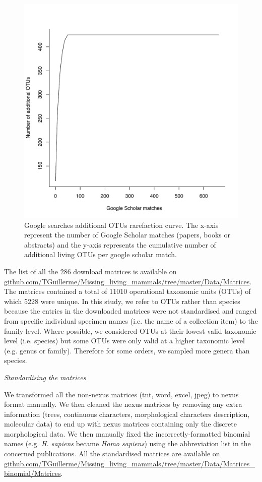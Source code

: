 \documentclass[12pt,letterpaper]{article}
\renewcommand{\subsection}[1]{%
\bigskip
\begin{center}
\begin{large}
\normalfont\itshape #1
\end{large}
\end{center}}
\begin{document}
\begin{figure}[!htbp]
\centering
    \includegraphics[width=1\textwidth]{Supp_figure_google_searches.pdf}
\caption{Google searches additional OTUs rarefaction curve. The x-axis represent the number of Google Scholar matches (papers, books or abstracts) and the y-axis represents the cumulative number of additional living OTUs per google scholar match.}
\label{Supp_figure_google_searches}
\end{figure}

The list of all the 286 download matrices is available on \url{github.com/TGuillerme/Missing_living_mammals/tree/master/Data/Matrices}.
The matrices contained a total of 11010 operational taxonomic units (OTUs) of which 5228 were unique.
In this study, we refer to OTUs rather than species because the entries in the downloaded matrices were not standardised and ranged from specific individual specimen names (i.e. the name of a collection item) to the family-level.
Where possible, we considered OTUs at their lowest valid taxonomic level (i.e. species) but some OTUs were only valid at a higher taxonomic level (e.g. genus or family).
Therefore for some orders, we sampled more genera than species.

\subsection{Standardising the matrices}
We transformed all the non-nexus matrices (tnt, word, excel, jpeg) to nexus format manually.
We then cleaned the nexus matrices by removing any extra information (trees, continuous characters, morphological characters description, molecular data) to end up with nexus matrices containing only the discrete morphological data.
We then manually fixed the incorrectly-formatted binomial names (e.g. \textit{H. sapiens} became \textit{Homo sapiens}) using the abbreviation list in the concerned publications. 
All the standardised matrices are available on \url{github.com/TGuillerme/Missing_living_mammals/tree/master/Data/Matrices_binomial/Matrices}.
\end{document}
